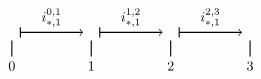 \documentclass[11pt]{beamer}
\theoremstyle{remark}
\theoremstyle{definition}
\theoremstyle{plain}
\begin{document}
\begin{frame}
\begin{itemize}
\[\begin{tikzpicture}[scale=2]
\begin{scope}[shift={(0,-1)}]
                            \draw[-, thick] (0,0.1) --  (0,-0.1) node[below] {$0$}; 
                            \draw[-, thick] (1,0.1) --  (1,-0.1) node[below] {$1$}; 
                            \draw[-, thick] (2,0.1) --  (2,-0.1) node[below] {$2$}; 
                            \draw[-, thick] (3,0.1) --  (3,-0.1) node[below] {$3$}; 

                            \draw[ |->, thick] (0.1, 0.2) -- (0.9, 0.2) node[midway, above]
                                {$i_{\ast, 1}^{0,1}$};
                            \draw[ |->, thick] (1.1, 0.2) -- (1.9, 0.2) node[midway, above]
                                {$i_{\ast, 1}^{1,2}$};
                            \draw[ |->, thick] (2.1, 0.2) -- (2.9, 0.2) node[midway, above]
                                {$i_{\ast, 1}^{2,3}$};
                        \end{scope}
                    \end{tikzpicture}
                \]
        \end{itemize}
    \end{frame}
\end{document}
